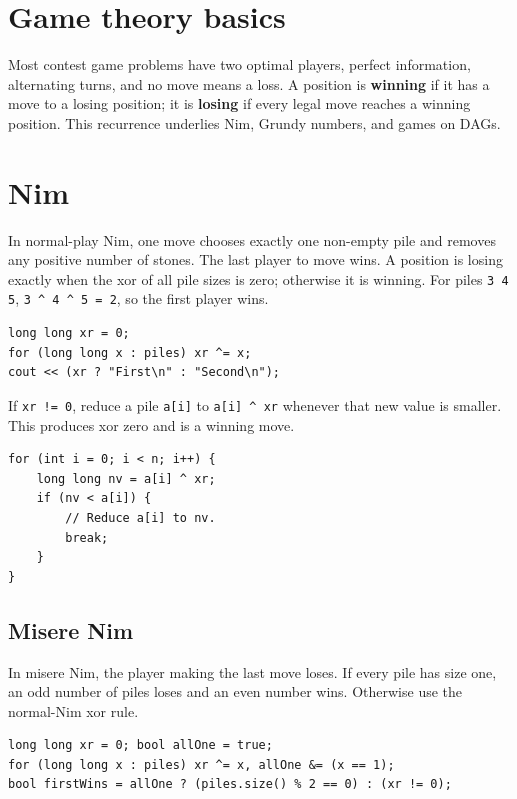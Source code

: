 \section{Game theory basics}

Most contest game problems have two optimal players, perfect information, alternating turns, and no move means a loss. A position is \textbf{winning} if it has a move to a losing position; it is \textbf{losing} if every legal move reaches a winning position. This recurrence underlies Nim, Grundy numbers, and games on DAGs.

\section{Nim}

In normal-play Nim, one move chooses exactly one non-empty pile and removes any positive number of stones. The last player to move wins. A position is losing exactly when the xor of all pile sizes is zero; otherwise it is winning. For piles \texttt{3 4 5}, \texttt{3 \^{} 4 \^{} 5 = 2}, so the first player wins.

\begin{lstlisting}
long long xr = 0;
for (long long x : piles) xr ^= x;
cout << (xr ? "First\n" : "Second\n");
\end{lstlisting}

If \texttt{xr != 0}, reduce a pile \texttt{a[i]} to \texttt{a[i] \^{} xr} whenever that new value is smaller. This produces xor zero and is a winning move.

\begin{lstlisting}
for (int i = 0; i < n; i++) {
    long long nv = a[i] ^ xr;
    if (nv < a[i]) {
        // Reduce a[i] to nv.
        break;
    }
}
\end{lstlisting}

\subsection{Misere Nim}

In misere Nim, the player making the last move loses. If every pile has size one, an odd number of piles loses and an even number wins. Otherwise use the normal-Nim xor rule.

\begin{lstlisting}
long long xr = 0; bool allOne = true;
for (long long x : piles) xr ^= x, allOne &= (x == 1);
bool firstWins = allOne ? (piles.size() % 2 == 0) : (xr != 0);
\end{lstlisting}

